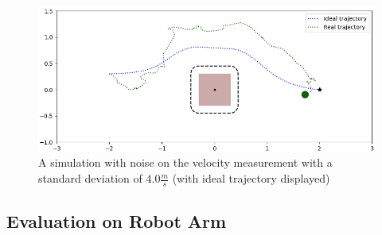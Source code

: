 \begin{figure}
\centerline{\includegraphics[width=\columnwidth]{figures/vel_noise_4.0.png}}
\caption{A simulation with noise on the velocity measurement with a standard deviation of $4.0 \frac{m}{s}$  (with ideal trajectory displayed)}
\label{fig_2_vel_noise}
\end{figure}


\subsection{Evaluation on Robot Arm}

